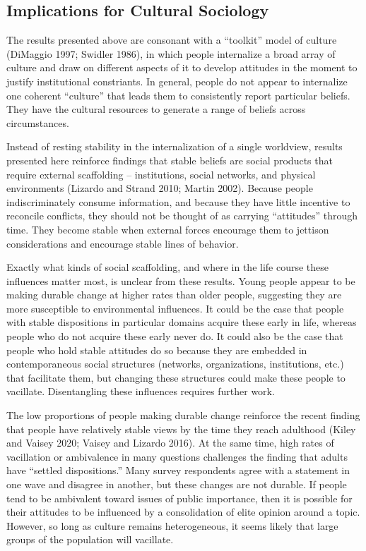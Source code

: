 \documentclass[12pt,]{article}
\begin{document}
\hypertarget{implications-for-cultural-sociology}{%
\subsection{Implications for Cultural Sociology}\label{implications-for-cultural-sociology}}

The results presented above are consonant with a ``toolkit'' model of culture (DiMaggio 1997; Swidler 1986), in which people internalize a broad array of culture and draw on different aspects of it to develop attitudes in the moment to justify institutional constriants. In general, people do not appear to internalize one coherent ``culture'' that leads them to consistently report particular beliefs. They have the cultural resources to generate a range of beliefs across circumstances.

Instead of resting stability in the internalization of a single worldview, results presented here reinforce findings that stable beliefs are social products that require external scaffolding -- institutions, social networks, and physical environments (Lizardo and Strand 2010; Martin 2002). Because people indiscriminately consume information, and because they have little incentive to reconcile conflicts, they should not be thought of as carrying ``attitudes'' through time. They become stable when external forces encourage them to jettison considerations and encourage stable lines of behavior.

Exactly what kinds of social scaffolding, and where in the life course these influences matter most, is unclear from these results. Young people appear to be making durable change at higher rates than older people, suggesting they are more susceptible to environmental influences. It could be the case that people with stable dispositions in particular domains acquire these early in life, whereas people who do not acquire these early never do. It could also be the case that people who hold stable attitudes do so because they are embedded in contemporaneous social structures (networks, organizations, institutions, etc.) that facilitate them, but changing these structures could make these people to vacillate. Disentangling these influences requires further work.

The low proportions of people making durable change reinforce the recent finding that people have relatively stable views by the time they reach adulthood (Kiley and Vaisey 2020; Vaisey and Lizardo 2016). At the same time, high rates of vacillation or ambivalence in many questions challenges the finding that adults have ``settled dispositions.'' Many survey respondents agree with a statement in one wave and disagree in another, but these changes are not durable. If people tend to be ambivalent toward issues of public importance, then it is possible for their attitudes to be influenced by a consolidation of elite opinion around a topic. However, so long as culture remains heterogeneous, it seems likely that large groups of the population will vacillate.
\end{document}
